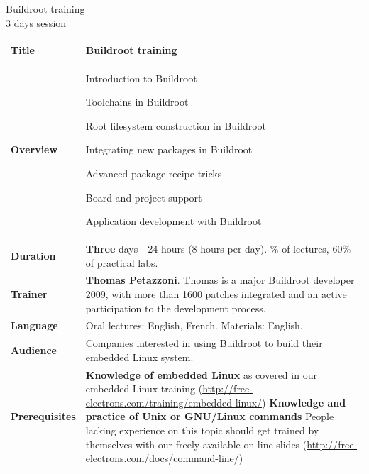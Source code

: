 \documentclass[a4paper,12pt,obeyspaces,spaces,hyphens]{article}
\begin{document}
\thispagestyle{fancy}

\setlength{\arrayrulewidth}{0.8pt}

\begin{center}
\LARGE
Buildroot training\\
\large
3 days session
\end{center}
\vspace{1cm}

\small
{}

 {
  \begin{tabularx}{\textwidth}{|g|h|}
    {\bf Title} & Buildroot training \\
    \hline

    {\bf Overview} &
    Introduction to Buildroot \par
    Toolchains in Buildroot \par
    Root filesystem construction in Buildroot \par
    Integrating new packages in Buildroot \par
    Advanced package recipe tricks \par
    Board and project support \par
    Application development with Buildroot \\
    \hline

    {\bf Duration} & {\bf Three} days - 24 hours (8 hours per day).
    \% of lectures, 60\% of practical labs. \\
    \hline

    {\bf Trainer} & {\bf Thomas Petazzoni}. Thomas is a major
    Buildroot developer 2009, with more than 1600 patches integrated
    and an active
    participation to the development process.\\
    \hline

    {\bf Language} & Oral lectures: English, French.
    \newline Materials: English.\\
    \hline

    {\bf Audience} & Companies interested in using Buildroot to build
    their
    embedded Linux system.\\
    \hline

    {\bf Prerequisites} & {\bf Knowledge of embedded Linux} as covered
    in our embedded Linux training
    (\url{http://free-electrons.com/training/embedded-linux/}) \newline 
    {\bf Knowledge and practice of Unix or GNU/Linux commands}
    \newline People lacking experience on this topic should get
    trained by themselves with our freely available on-line slides
    (\url{http://free-electrons.com/docs/command-line/}) \\
    \hline


\end{tabularx}}
\end{document}
